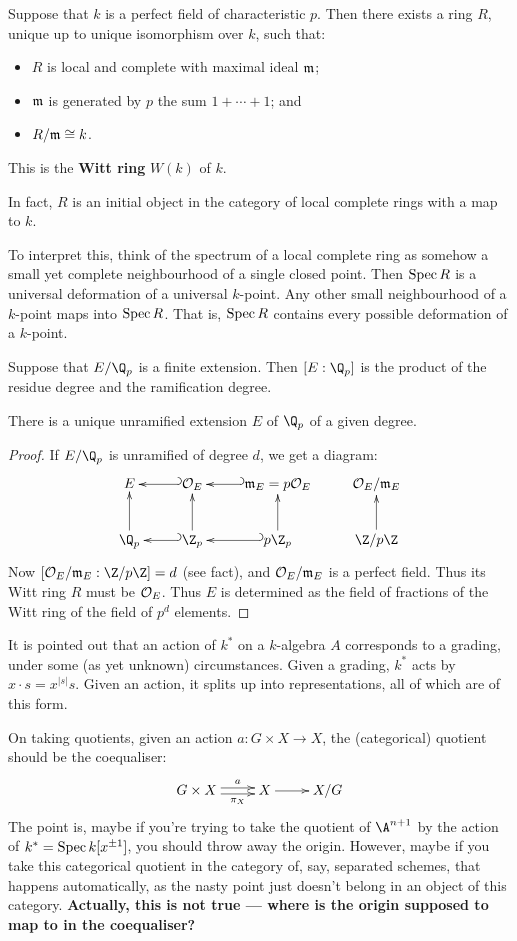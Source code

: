 \documentclass[11pt]{article}
\begin{document}
\begin{FirstTen}
\begin{thm*}
Suppose that $k$ is a perfect field of characteristic $p$. Then there exists a
ring $R$, unique up to unique isomorphism \lparen over $k$\rparen, such that:
\begin{itemize}\squishlist
\item $R$ is local and complete with maximal ideal $\mathfrak{m}$;
\item $\mathfrak{m}$ is generated by $p$ \lparen the sum $1+\cdots+1$\rparen; and
\item $R/\mathfrak{m}\cong k$.
\end{itemize}
This is the \textbf{Witt ring} $W(k)$ of $k$.

In fact, $R$ is an initial object in the category of local complete rings with a
map to $k$.
\end{thm*}
\noindent To interpret this, think of the spectrum of a local complete ring as
somehow a small yet complete neighbourhood of a single closed point. Then $\operatorname{Spec}
R$ is a universal deformation of a universal $k$-point. Any other small
neighbourhood of a $k$-point maps into $\operatorname{Spec} R$. That is, $\operatorname{Spec} R$ contains
every possible deformation of a $k$-point.
\begin{fact*}
Suppose that $E/\Q_p$ is a finite extension. Then $[E:\Q_p]$ is the product of
the residue degree and the ramification degree.
\end{fact*}
\begin{cor*}
There is a unique unramified extension $E$ of $\Q_p$ of a given degree.
\end{cor*}
\begin{proof}
If $E/\Q_p$ is unramified of degree $d$, we get a diagram:
\[\xymatrix{
E&\calO_E\ar@{_{(}->}[l]&\frakm_E=p\calO_E\ar@{_{(}->}[l]&\calO_E/\frakm_E\\
\Q_p\ar[u]&\Z_p\ar@{_{(}->}[l]\ar[u]&p\Z_p\ar@{_{(}->}
[l]\ar[u]&\Z/p\Z\ar[u]
}\]
Now $[\calO_E/\frakm_E:\Z/p\Z]=d$ (see fact), and $\mathcal{O}_E/\mathfrak{m}_E$ is a
perfect field. Thus its Witt ring $R$ must be $\mathcal{O}_E$. Thus $E$ is determined
as the field of fractions of the Witt ring of the field of $p^d$ elements.
\end{proof}
It is pointed out that an action of $k^*$ on a $k$-algebra $A$ corresponds to a
grading, under some (as yet unknown) circumstances. Given a grading, $k^*$ acts
by $x\cdot s=x^{|s|}s$. Given an action, it splits up into representations, all
of which are of this form.

On taking quotients, given an action $a:G\times X\to X$, the (categorical)
quotient should be the coequaliser:
\[\xymatrix{
G\times X\ar@<.5ex>[r]^{\ \ \ a}\ar@<-.5ex>[r]_{\ \ \ \pi_X}&X\ar[r]&X/G
}\]
The point is, maybe if you're trying to take the quotient of $\A^{n+1}$ by the
action of $k^*=\operatorname{Spec} k[x^{\pm1}]$, you should throw away the origin. However,
maybe if you take this categorical quotient in the category of, say, separated
schemes, that happens automatically, as the nasty point just doesn't belong in
an object of this category. \textbf{Actually, this is not true --- where is the origin supposed to map to in the coequaliser?}


\end{FirstTen}
\end{document}
